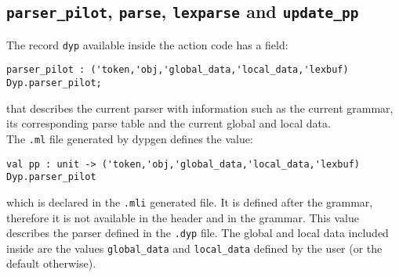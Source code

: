 \documentclass[12pt]{article}
\begin{document}
{\subsection{\texttt{parser\_pilot}, \texttt{parse}, \texttt{lexparse} and \texttt{update\_pp}}\label{parse}

The record \verb|dyp| available inside the action code has a field:
\begin{verbatim}
parser_pilot : ('token,'obj,'global_data,'local_data,'lexbuf) Dyp.parser_pilot;
\end{verbatim}
that describes the current parser with information such as the current grammar, its corresponding parse table and the current global and local data.\\

The \verb|.ml| file generated by dypgen defines the value:
\begin{verbatim}
val pp : unit -> ('token,'obj,'global_data,'local_data,'lexbuf) Dyp.parser_pilot
\end{verbatim}
which is declared in the \verb|.mli| generated file. It is defined after the grammar, therefore it is not available in the header and in the grammar. This value describes the parser defined in the \verb|.dyp| file. The global and local data included inside are the values \verb|global_data| and \verb|local_data| defined by the user (or the default otherwise).\\

}
\end{document}
